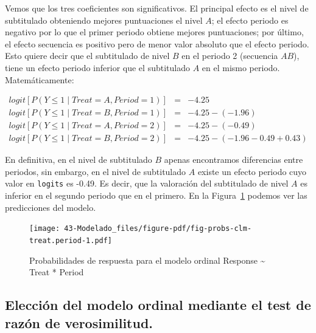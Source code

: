 \documentclass[
  12pt,
  a4paper,
  extrafontsizes,
  onecolumn,
  openright]{memoir}
\begin{document}
\normalsize

Vemos que los tres coeficientes son significativos. El principal efecto
es el nivel de subtitulado obteniendo mejores puntuaciones el nivel
\(A\); el efecto periodo es negativo por lo que el primer periodo
obtiene mejores puntuaciones; por último, el efecto secuencia es
positivo pero de menor valor absoluto que el efecto periodo. Esto quiere
decir que el subtitulado de nivel \(B\) en el periodo 2 (secuencia
\(AB\)), tiene un efecto periodo inferior que el subtitulado \(A\) en el
mismo periodo. Matemáticamente:

\[
\begin{aligned}
logit [P(Y \le 1 \mid Treat = A, Period = 1)] & = & -4.25 \\
logit [P(Y \le 1 \mid Treat = B, Period = 1)] & = & -4.25 - (-1.96) \\
logit [P(Y \le 1 \mid Treat = A, Period = 2)] & = & -4.25 - (-0.49) \\
logit [P(Y \le 1 \mid Treat = B, Period = 2)] & = & -4.25 -(-1.96 -0.49 + 0.43)
\end{aligned}
\]

En definitiva, en el nivel de subtitulado \(B\) apenas encontramos
diferencias entre periodos, sin embargo, en el nivel de subtitulado
\(A\) existe un efecto periodo cuyo valor en \texttt{logits} es -0.49.
Es decir, que la valoración del subtitulado de nivel \(A\) es inferior
en el segundo periodo que en el primero. En la
Figura~\ref{fig-probs-clm-treat.period} podemos ver las predicciones del
modelo.

\begin{figure}[h]

{\centering \texttt{[image: 43-Modelado\_files/figure-pdf/fig-probs-clm-treat.period-1.pdf]}

}

\caption{\label{fig-probs-clm-treat.period}Probabilidades de respuesta
para el modelo ordinal Response \textasciitilde{} Treat * Period}

\end{figure}

\hypertarget{elecciuxf3n-del-modelo-ordinal-mediante-el-test-de-razuxf3n-de-verosimilitud.}{%
\subsection{Elección del modelo ordinal mediante el test de razón de
verosimilitud.}\label{elecciuxf3n-del-modelo-ordinal-mediante-el-test-de-razuxf3n-de-verosimilitud.}}
\end{document}
